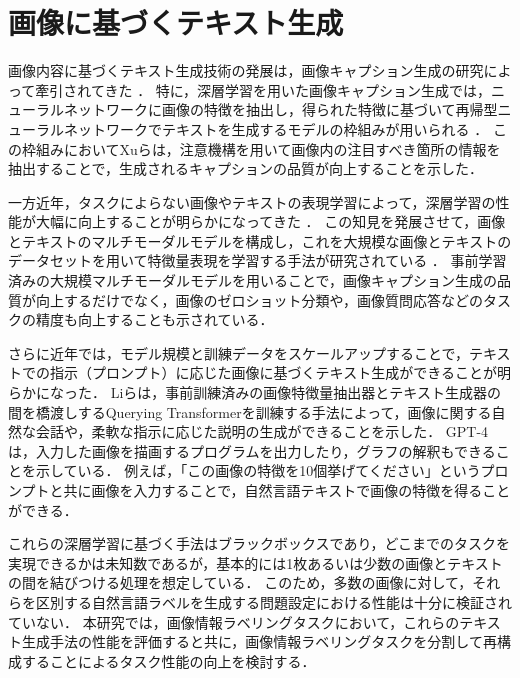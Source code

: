\documentclass[a4paper,11pt]{jreport}
\begin{document}
\section{画像に基づくテキスト生成}
\label{sec:relwork_image_captioning}
画像内容に基づくテキスト生成技術の発展は，画像キャプション生成の研究によって牽引されてきた \cite{Farhadi2010}．
特に，深層学習を用いた画像キャプション生成では，ニューラルネットワークに画像の特徴を抽出し，得られた特徴に基づいて再帰型ニューラルネットワークでテキストを生成するモデルの枠組みが用いられる \cite{Vinyals2017}．
この枠組みにおいてXuら\cite{Xu2015}は，注意機構を用いて画像内の注目すべき箇所の情報を抽出することで，生成されるキャプションの品質が向上することを示した．

一方近年，タスクによらない画像やテキストの表現学習によって，深層学習の性能が大幅に向上することが明らかになってきた \cite{Devlin2019}．
この知見を発展させて，画像とテキストのマルチモーダルモデルを構成し，これを大規模な画像とテキストのデータセットを用いて特徴量表現を学習する手法が研究されている \cite{Yin2023,Gan2022}．
事前学習済みの大規模マルチモーダルモデルを用いることで，画像キャプション生成の品質が向上する\cite{Dai2023}だけでなく，画像のゼロショット分類\cite{Radford2021}や，画像質問応答\cite{Song2022}などのタスクの精度も向上することも示されている．

さらに近年では，モデル規模と訓練データをスケールアップすることで，テキストでの指示（プロンプト）に応じた画像に基づくテキスト生成ができることが明らかになった．
Liら\cite{Li2023}は，事前訓練済みの画像特徴量抽出器とテキスト生成器の間を橋渡しするQuerying Transformerを訓練する手法によって，画像に関する自然な会話や，柔軟な指示に応じた説明の生成ができることを示した．
GPT-4\cite{Bubeck2023}は，入力した画像を描画するプログラムを出力したり，グラフの解釈もできることを示している．
例えば，「この画像の特徴を10個挙げてください」というプロンプトと共に画像を入力することで，自然言語テキストで画像の特徴を得ることができる．

これらの深層学習に基づく手法はブラックボックスであり，どこまでのタスクを実現できるかは未知数であるが，基本的には1枚あるいは少数の画像とテキストの間を結びつける処理を想定している．
このため，多数の画像に対して，それらを区別する自然言語ラベルを生成する問題設定における性能は十分に検証されていない．
本研究では，画像情報ラベリングタスクにおいて，これらのテキスト生成手法の性能を評価すると共に，画像情報ラベリングタスクを分割して再構成することによるタスク性能の向上を検討する．
\end{document}
